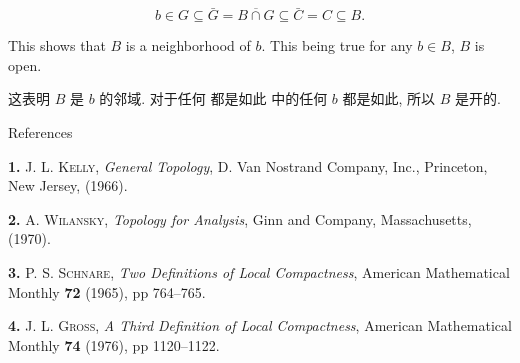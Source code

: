 \documentclass[options]{article}
\begin{document}
\[
		b \in G \subseteq \bar{G}=\overline{B \cap G} \subseteq \bar{C}=C \subseteq B .
\]
\begin{paracol}{2}

	\begin{en}
		This shows that $B$ is a neighborhood of $b$. This being true for any
		$b \in B$, $B$ is open.
	\end{en}
	\begin{cn}
		这表明 $B$ 是 $b$ 的邻域. 对于任何
		都是如此 中的任何 $b$ 都是如此, 所以 $B$ 是开的.
	\end{cn}
\end{paracol}

{\begin{center}\Large References\end{center}}

\textbf{1.} \textsc{J. L. Kelly}, \textit{General Topology}, D. Van Nostrand Company, Inc., Princeton,
New Jersey, (1966).

\textbf{2.} \textsc{A. Wilansky}, \textit{Topology for Analysis}, Ginn and Company,
Massachusetts, (1970).

\textbf{3.} \textsc{P. S. Schnare}, \textit{Two Definitions of Local Compactness}, American
Mathematical Monthly \textbf{72} (1965), pp 764--765.

\textbf{4.} \textsc{J. L. Gross}, \textit{A Third Definition of Local
Compactness}, American Mathematical Monthly \textbf{74} (1976), pp 1120--1122.
\end{document}
